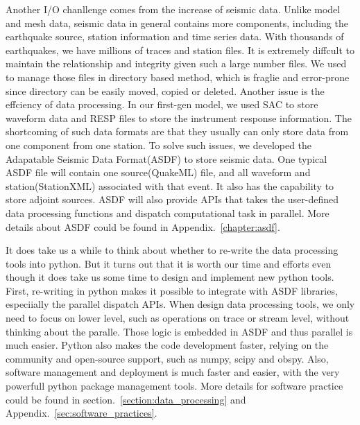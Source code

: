Another I/O chanllenge comes from the increase of seismic data. Unlike model and mesh data,
seismic data in general contains more components, including the earthquake source,
station information and time series data. With thousands of earthquakes, we have millions
of traces and station files. It is extremely
diffcult to maintain the relationship and integrity given such a large number files. We used to manage
those files in directory based method, which is fraglie and error-prone since directory
can be easily moved, copied or deleted. Another issue is the effciency of data processing.
In our first-gen model, we used SAC to store waveform data and RESP files to store the instrument
response information. The shortcoming of such data formats are that they usually can only store 
data from one component from one station. To solve such issues, we developed the Adapatable
Seismic Data Format(ASDF) to store seismic data. One typical ASDF file will contain one
source(QuakeML) file, and all waveform and station(StationXML) associated with that event.
It also has the capability to store adjoint sources. ASDF will also provide APIs that takes
the user-defined data processing functions and dispatch computational task in parallel.
More details about ASDF could be found in Appendix.~\ref{chapter:asdf}.

It does take us a while to think about whether to re-write the data processing tools
into python. But it turns out that it is worth our time and efforts even though it does
take us some time to design and implement new python tools. First, re-writing in python
makes it possible to integrate with ASDF libraries, especiially the parallel dispatch APIs.
When design data processing tools, we only need to focus on lower level, such as
operations on trace or stream level, without thinking about the paralle. Those logic is 
embedded in ASDF and thus parallel is much easier. Python also makes the code development
faster, relying on the community and open-source support, such as numpy, scipy and obspy.
Also, software management and deployment is much faster and easier, with the very powerfull
python package management tools. More details for software practice could be found in 
section.~\ref{section:data_processing} and Appendix.~\ref{sec:software_practices}.

